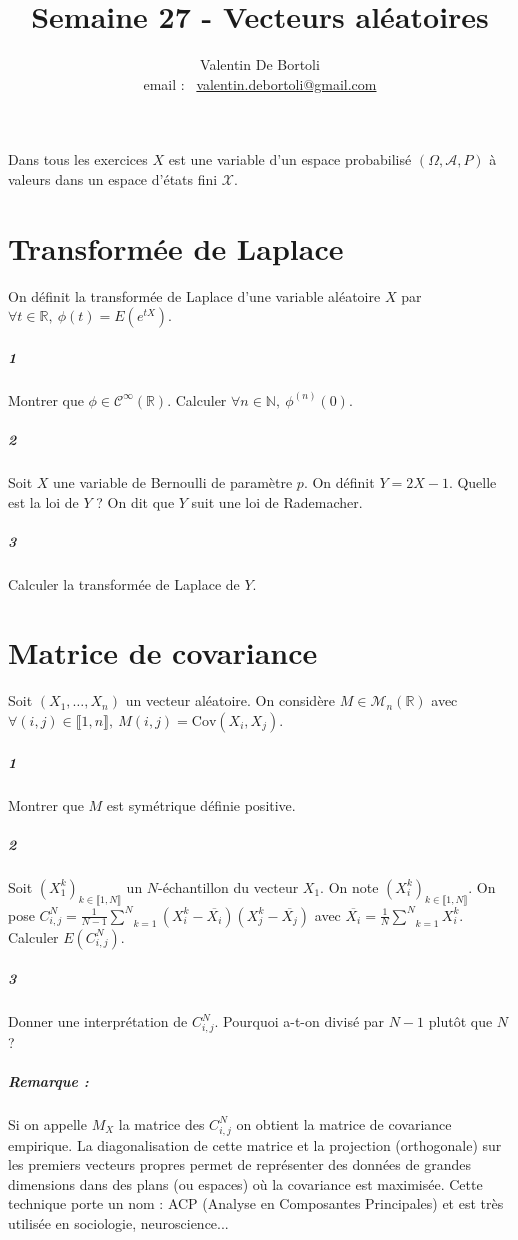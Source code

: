 \documentclass[10pt,a4paper]{article}
\title{Semaine 27 - Vecteurs aléatoires}
\author{Valentin De Bortoli \\ email : \ \href{mailto:valentin.debortoli@gmail.com}{valentin.debortoli@gmail.com}}
\date{}
\begin{document}
\maketitle

Dans tous les exercices $X$ est une variable d'un espace probabilisé $(\Omega, \mathcal{A}, P)$ à valeurs dans un espace d'états fini $\mathcal{X}$.

\section{Transformée de Laplace}
On définit la transformée de Laplace d'une variable aléatoire $X$ par $\forall t \in \mathbb{R}, \ \phi(t) = E(e^{tX})$.
\subparagraph{1} Montrer que $\phi \in \mathcal{C}^{\infty} \left( \mathbb{R} \right)$. Calculer $\forall n \in \mathbb{N}, \ \phi^{(n)}(0)$.
\subparagraph{2}Soit $X$ une variable de Bernoulli de paramètre $p$. On définit $Y = 2X-1$. Quelle est la loi de $Y$ ? On dit que $Y$ suit une loi de Rademacher.
\subparagraph{3}Calculer la transformée de Laplace de $Y$.

\section{Matrice de covariance}
Soit $(X_1, \dots, X_n)$ un vecteur aléatoire. On considère $M \in \mathcal{M}_n \left( \mathbb{R} \right)$ avec $\forall (i,j) \in \llbracket 1,n \rrbracket, \ M(i,j) = \text{Cov}(X_i,X_j)$.
\subparagraph{1}Montrer que $M$ est symétrique définie positive.
\subparagraph{2}Soit $(X_1^k)_{k \in \llbracket 1,N \rrbracket}$ un $N$-échantillon du vecteur $X_1$. On note $(X_i^k)_{k \in \llbracket 1,N \rrbracket}$. On pose $C_{i,j}^N = \frac{1}{N-1}\underset{k=1}{\overset{N}{\sum}}(X_i^k-\overline{X_i})(X_j^k-\overline{X_j})$ avec $\overline{X_i} = \frac{1}{N} \underset{k=1}{\overset{N}{\sum}}X_i^k$. Calculer $E(C_{i,j}^N)$.
\subparagraph{3}Donner une interprétation de $C_{i,j}^N$. Pourquoi a-t-on divisé par $N-1$ plutôt que $N$ ?
\subparagraph{Remarque : } Si on appelle $M_X$ la matrice des $C_{i,j}^N$ on obtient la matrice de covariance empirique. La diagonalisation de cette matrice et la projection (orthogonale) sur les premiers vecteurs propres permet de représenter des données de grandes dimensions dans des plans (ou espaces) où la covariance est maximisée. Cette technique porte un nom : ACP (Analyse en Composantes Principales) et est très utilisée en sociologie, neuroscience...
\end{document}
